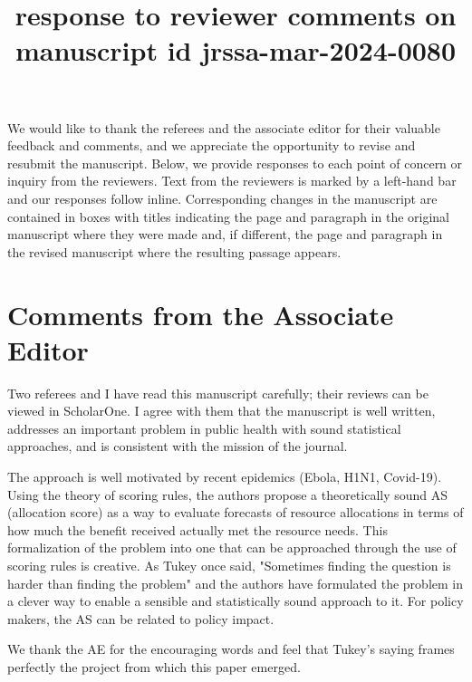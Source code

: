 \documentclass{article}
\author{}
\title{response to reviewer comments on \\ manuscript id jrssa-mar-2024-0080}
\begin{document}
\newcommand{\del}[2]{\frac{\partial {#1} }{\partial {#2}} }
\newcommand{\dby}[2]{\frac{d {#1} }{d {#2}} }
\newcommand{\sbar}{\overline{s}}
\newtheorem{proposition}{Proposition}

\theoremstyle{remark}
\newtheorem*{remark}{Remark}

\maketitle

We would like to thank the referees and the associate editor for their valuable feedback and comments, and we appreciate the opportunity 
to revise and resubmit the manuscript.  Below, we provide responses to each point of concern or inquiry from the reviewers.
Text from the reviewers is marked by a left-hand bar and our responses follow inline.  Corresponding changes in the manuscript are contained
in boxes with titles indicating the page and paragraph in the original manuscript where they were made and, if different, the page 
and paragraph in the revised manuscript where the resulting passage appears.

\section*{Comments from the Associate Editor}

\begin{quotebar}
Two referees and I have read this manuscript carefully; their reviews
can be viewed in ScholarOne.  I agree with them that the manuscript is
well written, addresses an important problem in public health with sound
statistical approaches, and is consistent with the mission of the journal.

The approach is well motivated by recent epidemics (Ebola, H1N1, Covid-19).
Using the theory of scoring rules, the authors propose a theoretically
sound AS (allocation score) as a way to evaluate forecasts of resource
allocations in terms of how much the benefit received actually met the
resource needs.  This formalization of the problem into one that can be
approached through the use of scoring rules is creative. As Tukey once
said, "Sometimes finding the question is harder than finding the problem"
and the authors have formulated the problem in a clever way to enable a
sensible and statistically sound approach to it. For policy makers,
the AS can be related to policy impact.
\end{quotebar}

We thank the AE for the encouraging words and feel that Tukey's saying frames perfectly
the project from which this paper emerged.
\end{document}
